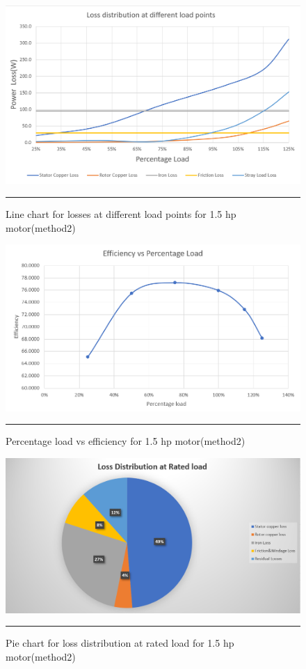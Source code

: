 \begin{figure}[htbp]
	\centering
		\includegraphics[width = 4.5in]{./Figures/MS/fig520.png}
		\rule{35em}{0.5pt}
	\caption{Line chart for losses at different load points for 1.5 hp motor(method2)}
	\label{fig:Line chart for losses at different load points for 1.5 hp motor(method2)} 
\end{figure}
\begin{figure}[htbp]
	\centering
		\includegraphics[width = 4.5in]{./Figures/MS/fig521.png}
		\rule{35em}{0.5pt}
	\caption{Percentage load vs efficiency for 1.5 hp motor(method2)}
	\label{fig:Percentage load vs efficiency for 1.5 hp motor(method2)} 
\end{figure}
\begin{figure}[htbp]
	\centering
		\includegraphics[width = 4.5in]{./Figures/MS/fig522.png}
		\rule{35em}{0.5pt}
	\caption{Pie chart for loss distribution at rated load for 1.5 hp motor(method2)}
	\label{fig:Pie chart for loss distribution at rated load for 1.5 hp motor(method2)} 
\end{figure}